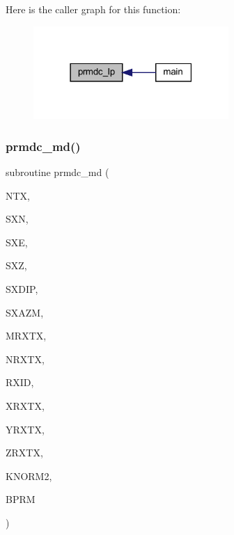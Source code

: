 Here is the caller graph for this function\+:\nopagebreak
\begin{figure}[H]
\begin{center}
\leavevmode
\includegraphics[width=210pt]{Leroi_8f90_a2332afca7e33269a0f374989bededf94_icgraph}
\end{center}
\end{figure}
\mbox{\label{Leroi_8f90_a2212318f6dd3a1fda873532ddfb09348}} 
\subsubsection{\texorpdfstring{prmdc\+\_\+md()}{prmdc\_md()}}
{\footnotesize\ttfamily subroutine prmdc\+\_\+md (\begin{DoxyParamCaption}\item[{integer}]{N\+TX,  }\item[{real, dimension (1,ntx)}]{S\+XN,  }\item[{real, dimension (1,ntx)}]{S\+XE,  }\item[{real, dimension (ntx)}]{S\+XZ,  }\item[{real, dimension (ntx)}]{S\+X\+D\+IP,  }\item[{real, dimension (ntx)}]{S\+X\+A\+ZM,  }\item[{integer}]{M\+R\+X\+TX,  }\item[{integer, dimension(ntx)}]{N\+R\+X\+TX,  }\item[{integer, dimension(mrxtx,ntx)}]{R\+X\+ID,  }\item[{real, dimension (mrxtx,ntx,1)}]{X\+R\+X\+TX,  }\item[{real, dimension (mrxtx,ntx,1)}]{Y\+R\+X\+TX,  }\item[{real, dimension(mrxtx,ntx)}]{Z\+R\+X\+TX,  }\item[{integer, dimension(mrxtx,ntx)}]{K\+N\+O\+R\+M2,  }\item[{real, dimension(mrxtx,ntx)}]{B\+P\+RM }\end{DoxyParamCaption})}

